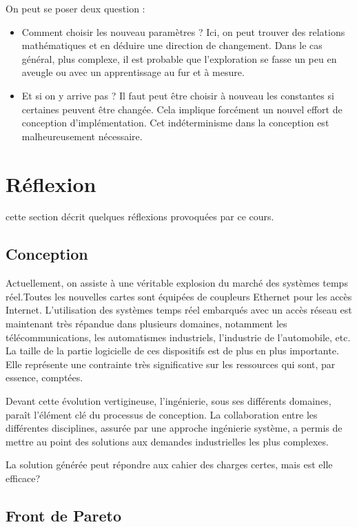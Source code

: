 \documentclass[11pt]{article}
\begin{document}
On peut se poser deux question :
\begin{itemize}
\item Comment choisir les nouveau paramètres ? Ici, on peut trouver des relations mathématiques et en déduire une direction de changement. Dans le cas général, plus complexe, il est probable que l'exploration se fasse un peu en aveugle ou avec un apprentissage au fur et à mesure.
\item Et si on y arrive pas ? Il faut peut être choisir à nouveau les constantes si certaines peuvent être changée. Cela implique forcément un nouvel effort de conception d'implémentation. Cet indéterminisme dans la conception est malheureusement nécessaire.
\end{itemize}

\section{Réflexion}

cette section décrit quelques réflexions provoquées par ce cours.

\subsection{Conception}

Actuellement, on assiste à une véritable explosion du marché des systèmes temps réel.Toutes les nouvelles cartes sont équipées de coupleurs Ethernet pour les accès Internet. L'utilisation des systèmes temps réel embarqués avec un accès réseau est maintenant très répandue dans plusieurs domaines, notamment les télécommunications, les automatismes industriels, l'industrie de l’automobile, etc. La taille de la partie logicielle de ces dispositifs est de plus en plus importante. Elle représente une contrainte très significative sur les ressources qui sont, par essence, comptées.

Devant cette évolution vertigineuse, l'ingénierie, sous ses différents domaines, paraît l'élément clé du processus de conception. La collaboration entre les différentes disciplines, assurée par une approche ingénierie système, a permis de mettre au point des solutions aux demandes industrielles les plus complexes.

La solution générée peut répondre aux cahier des charges certes, mais est elle efficace?

\subsection{Front de Pareto}
\end{document}
